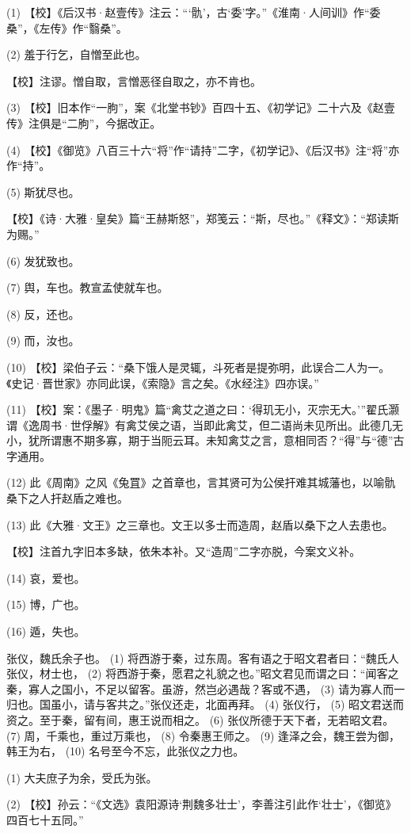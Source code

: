 \documentclass[12pt,UTF8]{ctexbook}
\begin{document}
(1) 【校】《后汉书·赵壹传》注云：“‘骩’，古‘委’字。”《淮南·人间训》作“委桑”，《左传》作“翳桑”。

(2) 羞于行乞，自憎至此也。

【校】注谬。憎自取，言憎恶径自取之，亦不肯也。

(3) 【校】旧本作“一朐”，案《北堂书钞》百四十五、《初学记》二十六及《赵壹传》注俱是“二朐”，今据改正。

(4) 【校】《御览》八百三十六“将”作“请持”二字，《初学记》、《后汉书》注“将”亦作“持”。

(5) 斯犹尽也。

【校】《诗·大雅·皇矣》篇“王赫斯怒”，郑笺云：“斯，尽也。”《释文》：“郑读斯为赐。”

(6) 发犹致也。

(7) 舆，车也。教宣孟使就车也。

(8) 反，还也。

(9) 而，汝也。

(10) 【校】梁伯子云：“桑下饿人是灵辄，斗死者是提弥明，此误合二人为一。《史记·晋世家》亦同此误，《索隐》言之矣。《水经注》四亦误。”

(11) 【校】案：《墨子·明鬼》篇“禽艾之道之曰：‘得玑无小，灭宗无大。’”翟氏灏谓《逸周书·世俘解》有禽艾侯之语，当即此禽艾，但二语尚未见所出。此德几无小，犹所谓惠不期多寡，期于当阨云耳。未知禽艾之言，意相同否？“得”与“德”古字通用。

(12) 此《周南》之风《兔罝》之首章也，言其贤可为公侯扞难其城藩也，以喻骩桑下之人扞赵盾之难也。

(13) 此《大雅·文王》之三章也。文王以多士而造周，赵盾以桑下之人去患也。

【校】注首九字旧本多缺，依朱本补。又“造周”二字亦脱，今案文义补。

(14) 哀，爱也。

(15) 博，广也。

(16) 遁，失也。

张仪，魏氏余子也。 (1) 将西游于秦，过东周。客有语之于昭文君者曰：“魏氏人张仪，材士也， (2) 将西游于秦，愿君之礼貌之也。”昭文君见而谓之曰：“闻客之秦，寡人之国小，不足以留客。虽游，然岂必遇哉？客或不遇， (3) 请为寡人而一归也。国虽小，请与客共之。”张仪还走，北面再拜。 (4) 张仪行， (5) 昭文君送而资之。至于秦，留有间，惠王说而相之。 (6) 张仪所德于天下者，无若昭文君。 (7) 周，千乘也，重过万乘也， (8) 令秦惠王师之。 (9) 逢泽之会，魏王尝为御，韩王为右， (10) 名号至今不忘，此张仪之力也。

(1) 大夫庶子为余，受氏为张。

(2) 【校】孙云：“《文选》袁阳源诗‘荆魏多壮士’，李善注引此作‘壮士’，《御览》四百七十五同。”
\end{document}
